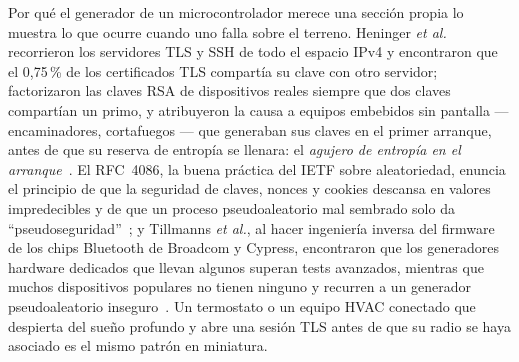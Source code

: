 Por qué el generador de un microcontrolador merece una sección propia lo
muestra lo que ocurre cuando uno falla sobre el terreno. Heninger
\emph{et al.} recorrieron los servidores TLS y SSH de todo el espacio
IPv4 y encontraron que el 0,75\,\% de los certificados TLS compartía su
clave con otro servidor; factorizaron las claves RSA de dispositivos
reales siempre que dos claves compartían un primo, y atribuyeron la causa
a equipos embebidos sin pantalla --- encaminadores, cortafuegos --- que
generaban sus claves en el primer arranque, antes de que su reserva de
entropía se llenara: el \emph{agujero de entropía en el
arranque}~\cite{heninger_2012_mining}. El RFC~4086, la buena práctica del
IETF sobre aleatoriedad, enuncia el principio de que la seguridad de
claves, nonces y cookies descansa en valores impredecibles y de que un
proceso pseudoaleatorio mal sembrado solo da
``pseudoseguridad''~\cite{eastlake_2005_rfc4086}; y Tillmanns \emph{et
al.}, al hacer ingeniería inversa del firmware de los chips Bluetooth de
Broadcom y Cypress, encontraron que los generadores hardware dedicados
que llevan algunos superan tests avanzados, mientras que muchos
dispositivos populares no tienen ninguno y recurren a un generador
pseudoaleatorio inseguro~\cite{tillmanns_2020_firmware}. Un termostato o
un equipo HVAC conectado que despierta del sueño profundo y abre una
sesión TLS antes de que su radio se haya asociado es el mismo patrón en
miniatura.

